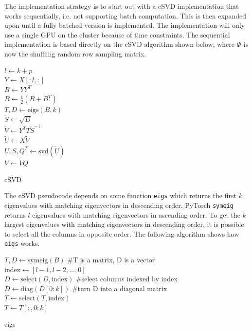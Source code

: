   
The implementation strategy is to start out with a cSVD implementation that works sequentially, i.e. not supporting batch computation. This is then expanded upon until a fully batched version is implemented. The implementation will only use a single GPU on the cluster because of time constraints. The sequential implementation is based directly on the cSVD algorithm shown below, where $\Phi$ is now the shuffling random row sampling matrix.

\begin{algorithm}[H]
\SetAlgoLined
{}
$l \gets k + p$ \\
$Y \gets X[:l,:]$ \\
$B \gets Y Y^T$ \\
$B \gets \frac{1}{2}(B + B^T)$ \\
$T,D \gets \mathrm{eigs}(B,k)$ \\
$\tilde S \gets \sqrt{D}$ \\
$\tilde V \gets Y^T T \tilde S^{-1}$ \\
$\tilde U \gets X \tilde V$ \\
$U,S,Q^T \gets \mathrm{svd}(\tilde U)$ \\
$V \gets \tilde V Q$ \\
\caption{cSVD}
\end{algorithm}

The cSVD pseudocode depends on some function \texttt{eigs} which returns the first $k$ eigenvalues with matching eigenvectors in descending order. PyTorch \texttt{symeig} returns $l$ eigenvalues with matching eigenvectors in ascending order. To get the $k$ largest eigenvalues with matching eigenvectors in descending order, it is possible to select all the columns in opposite order. The following algorithm shows how \texttt{eigs} works.

\begin{algorithm}[H]
\SetAlgoLined
{}
$T,D \gets \mathrm{symeig}(B)$ \#T is a matrix, D is a vector \\
$\mathrm{index} \gets [l-1, l-2,..., 0]$ \\
$D \gets \mathrm{select}(D, \mathrm{index})$ \#select columns indexed by index \\
$D \gets \mathrm{diag}(D[0:k])$ \#turn D into a diagonal matrix \\
$T \gets \mathrm{select}(T, \mathrm{index})$ \\
$T \gets T[:,0:k]$ \\
\caption{eigs}
\label{alg:eigs}
\end{algorithm}

